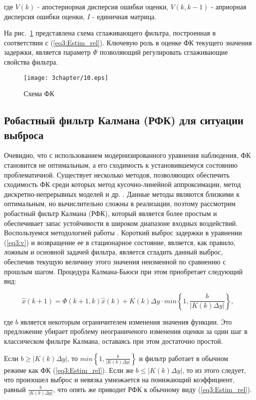 \noindent где $V(k)$ - апостериорная дисперсия ошибки оценки, $V(k,k-1)$ - априорная дисперсия ошибки оценки, $I$ - единичная матрица.

На рис. \ref{img3:kalmanF} представлена схема сглаживающего фильтра, построенная в соответствии с (\ref{eq3:Estim_rel}). Ключевую роль в оценке ФК текущего значения задержки, является параметр $\Phi$ позволяющий регулировать сглаживающие свойства фильтра. 

\begin{figure} [h]
  \center
\texttt{[image: 3chapter/10.eps]}
  \caption{Схема ФК}
  \label{img3:kalmanF}
\end{figure}




\subsection{Робастный фильтр Калмана (РФК) для ситуации выброса} \label{sect3_5_1}
Очевидно, что с использованием модернизированного уравнения наблюдения, ФК становится не оптимальным, а его сходимость к установившемуся состоянию проблематичной. Существует несколько методов, позволяющих обеспечить сходимость ФК среди которых метод кусочно-линейной аппроксимации, метод дискретно-непрерывных моделей и др. \cite{Chernavskiy,Rasina}. Данные методы являются близкими к оптимальным, но вычислительно сложны в реализации, поэтому рассмотрим робастный фильтр Калмана (РФК), который является более простым и обеспечивает запас устойчивости в широком диапазоне входных воздействий.
Воспользуемся методологией работы \cite{RobustFilter}. Короткий выброс задержки в уравнении (\ref{eq3:v}) и возвращение ее в стационарное состояние, является, как правило, ложным и основной задачей фильтра, является сгладить данный выброс, обеспечив текущую величину этого значения неизменной по сравнению с прошлым шагом. Процедура Калмана-Бьюси при этом приобретает следующий вид:

\begin{equation}\label{eq3:skachok}
\hat{x}(k+1)=\Phi(k+1,k)\hat{x}(k)+K(k)\Delta y\cdot min\left\{1,\frac{b}{|K(k)\Delta y|}\right\},
\end{equation}

\noindent где $b$ является некоторым ограничителем изменения значения функции. Это предложение убирает проблему неограниченого изменения оценки за один шаг в классическом фильтре Калмана, оставаясь при этом достаточно простой.

Если $b\geq |K(k) \Delta y |$, то $min\left\{1,\frac{b}{|K(k)\Delta y|}\right\}$ и фильтр работает в обычном режиме как ФК (\ref{eq3:Estim_rel}). Если же $b\leq |K(k) \Delta y |$, то из этого следует, что произошел выброс и невязка умножается на понижающий коэффициент, равный $\frac{b}{|K(k)\Delta y|}$, что опять же приводит РФК к обычному виду (\ref{eq3:Estim_rel}).

